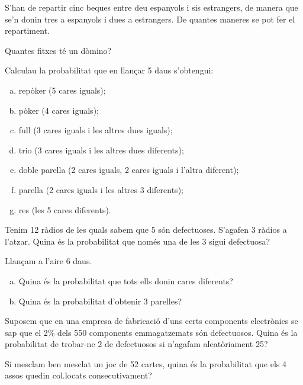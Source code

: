 \documentclass[12pt]{article}
\begin{document}
\probl  S'han de repartir cinc beques entre deu espanyols i sis
estrangers, de manera que se'n donin tres a espanyols i dues a
estrangers. De quantes maneres se pot fer el repartiment. 

\probl  Quantes fitxes t\'{e} un d\`{o}mino? 




\probl  Calculau la probabilitat que en llan\c{c}ar 5 daus s'obtengui:
\begin{enumerate}[a)]
\item rep\`{o}ker (5 cares iguals);
\item p\`{o}ker (4 cares iguals);
\item full (3 cares iguals i les altres dues iguals);
\item trio (3 cares iguals i les altres dues diferents);
\item doble parella (2 cares iguals, 2 cares iguals i l'altra
diferent);
\item parella (2 cares iguals i les altres 3 diferents);
\item res (les 5 cares diferents).
\end{enumerate}

\probl  Tenim 12 r\`{a}dios de les quals sabem que 5 s\'{o}n defectuoses.
S'agafen 3 r\`{a}dios a l'atzar. Quina \'{e}s la probabilitat que nom\'{e}s
una de les 3 sigui defectuosa? 

\probl  Llan\c{c}am a l'aire 6 daus. %
\begin{enumerate}[a)]
\item Quina \'{e}s la probabilitat que tots ells donin cares
diferents?
\item Quina \'{e}s la probabilitat d'obtenir 3 parelles?
\end{enumerate}

\probl  Suposem que en una empresa de fabricaci\'{o} d'uns certs
components electr\`{o}nics se sap que el 2\% dels 550 components
emmagatzemats s\'{o}n defectuosos. Quina \'{e}s la probabilitat de
trobar-ne 2 de defectuosos si n'agafam aleat\`{o}riament 25?

\probl  Si mesclam ben mesclat un joc de 52 cartes, quina \'{e}s la
probabilitat que els 4 assos quedin col.locats consecutivament?
\end{document}
